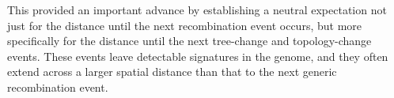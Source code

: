 \documentclass[11pt]{article}
\begin{document}
This provided an important advance by establishing a neutral expectation 
not just for the distance until the next recombination event occurs, 
but more specifically for the distance until the next tree-change and topology-change
events. These events leave 
detectable signatures in the genome, and they often extend across a larger 
spatial distance than that to the next generic recombination event. 






\end{document}
